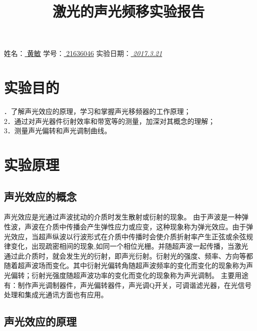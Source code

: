 \documentclass[UTF8,a4paper,12pt]{article}
\begin{document}

\title{\huge{激光的声光频移实验报告}}
\date{}
\maketitle

\thispagestyle{newpagestyle}


\begin{center}
\large{姓名：\underline{ 黄敏}}\hspace{1cm}
\large{学号：\underline{ 21636046}}\hspace{1cm}
\large{实验日期：\underline{ \textit{2017.3.21}}}
\end{center}
\section{实验目的}

．了解声光效应的原理，学习和掌握声光移频器的工作原理；\\
2．通过对声光器件衍射效率和带宽等的测量，加深对其概念的理解；\\
3．测量声光偏转和声光调制曲线。


\section{实验原理}
\subsection{声光效应的概念}
声光效应是光通过声波扰动的介质时发生散射或衍射的现象。
由于声波是一种弹性波，声波在介质中传播会产生弹性应力或应变，这种现象称为弹光效应。由于弹光效应，当超声纵波以行波形式在介质中传播时会使介质折射率产生正弦或余弦规律变化，出现疏密相间的现象,如同一个相位光栅。并随超声波一起传播，当激光通过此介质时，就会发生光的衍射，即声光衍射。衍射光的强度、频率、方向等都随着超声波场而变化。其中衍射光偏转角随超声波频率的变化而变化的现象称为声光偏转；衍射光强度随超声波功率的变化而变化的现象称为声光调制。
主要用途有：制作声光调制器件，声光偏转器件，声光调Q开关，可调谐滤光器，在光信号处理和集成光通讯方面也有应用。



\subsection{声光效应的原理}
\end{document}
